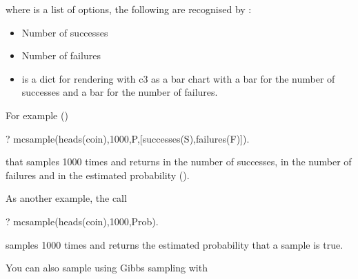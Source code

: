 \documentclass[letterpaper,10pt,english]{sphinxmanual}
\begin{document}
where  is a list of options, the following are recognised by :
\begin{itemize}
\item {} 
 Number of successes

\item {} 
 Number of failures

\item {} 
  is a dict for rendering with c3 as a bar chart with a bar for the number of successes and a bar for the number of failures.

\end{itemize}

For example ()

\begin{sphinxVerbatim}[commandchars=\\\{\}]
?\PYGZhy{} mc\PYGZus{}sample(heads(coin),1000,P,[successes(S),failures(F)]).
\end{sphinxVerbatim}

that samples  1000 times and returns in  the number of successes, in  the number of failures and in  the estimated probability ().

As another example, the call

\begin{sphinxVerbatim}[commandchars=\\\{\}]
?\PYGZhy{} mc\PYGZus{}sample(heads(coin),1000,Prob).
\end{sphinxVerbatim}

samples  1000 times and returns the estimated probability that a sample is true.

You can also sample using Gibbs sampling with

\begin{sphinxVerbatim}[commandchars=\\\{\}]
  
\end{sphinxVerbatim}
\end{document}
